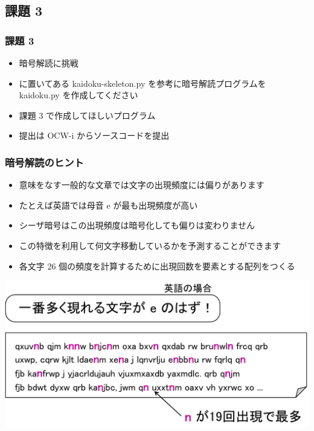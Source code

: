 \subsection{課題 3}
\begin{frame}
\frametitle{課題 3}
  \begin{itemize}
\item 暗号解読に挑戦
\item \href{https://sites.google.com/a/presystems.xyz/sample/home/elementary-computer-science}{}に置いてある kaidoku-skeleton.py を参考に暗号解読プログラムを kaidoku.py を作成してください
\item 課題 3 で作成してほしいプログラム
\item 提出は OCW-i からソースコードを提出
  \end{itemize}
\end{frame}
\begin{frame}
\frametitle{暗号解読のヒント}
  \begin{itemize}
\item 意味をなす一般的な文章では文字の出現頻度には偏りがあります
\item たとえば英語では母音 e が最も出現頻度が高い
\item シーザ暗号はこの出現頻度は暗号化しても偏りは変わりません
\item この特徴を利用して何文字移動しているかを予測することができます
\item 各文字 26 個の頻度を計算するために出現回数を要素とする配列をつくる
  \end{itemize}
  \begin{center}
\includegraphics[scale=0.3]{./Figure/elementaryCS-figHintForCryptoanalysis.pdf}
  \end{center}
\end{frame}
